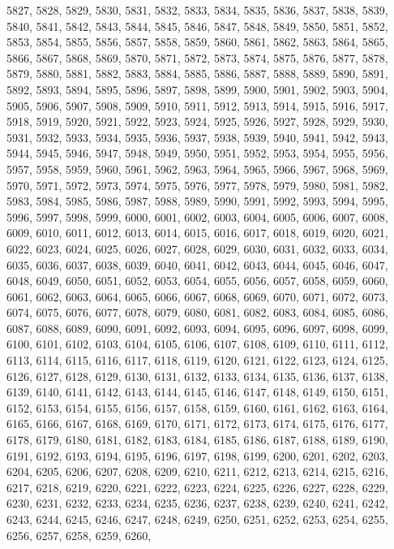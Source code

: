 5827,
5828,
5829,
5830,
5831,
5832,
5833,
5834,
5835,
5836,
5837,
5838,
5839,
5840,
5841,
5842,
5843,
5844,
5845,
5846,
5847,
5848,
5849,
5850,
5851,
5852,
5853,
5854,
5855,
5856,
5857,
5858,
5859,
5860,
5861,
5862,
5863,
5864,
5865,
5866,
5867,
5868,
5869,
5870,
5871,
5872,
5873,
5874,
5875,
5876,
5877,
5878,
5879,
5880,
5881,
5882,
5883,
5884,
5885,
5886,
5887,
5888,
5889,
5890,
5891,
5892,
5893,
5894,
5895,
5896,
5897,
5898,
5899,
5900,
5901,
5902,
5903,
5904,
5905,
5906,
5907,
5908,
5909,
5910,
5911,
5912,
5913,
5914,
5915,
5916,
5917,
5918,
5919,
5920,
5921,
5922,
5923,
5924,
5925,
5926,
5927,
5928,
5929,
5930,
5931,
5932,
5933,
5934,
5935,
5936,
5937,
5938,
5939,
5940,
5941,
5942,
5943,
5944,
5945,
5946,
5947,
5948,
5949,
5950,
5951,
5952,
5953,
5954,
5955,
5956,
5957,
5958,
5959,
5960,
5961,
5962,
5963,
5964,
5965,
5966,
5967,
5968,
5969,
5970,
5971,
5972,
5973,
5974,
5975,
5976,
5977,
5978,
5979,
5980,
5981,
5982,
5983,
5984,
5985,
5986,
5987,
5988,
5989,
5990,
5991,
5992,
5993,
5994,
5995,
5996,
5997,
5998,
5999,
6000,
6001,
6002,
6003,
6004,
6005,
6006,
6007,
6008,
6009,
6010,
6011,
6012,
6013,
6014,
6015,
6016,
6017,
6018,
6019,
6020,
6021,
6022,
6023,
6024,
6025,
6026,
6027,
6028,
6029,
6030,
6031,
6032,
6033,
6034,
6035,
6036,
6037,
6038,
6039,
6040,
6041,
6042,
6043,
6044,
6045,
6046,
6047,
6048,
6049,
6050,
6051,
6052,
6053,
6054,
6055,
6056,
6057,
6058,
6059,
6060,
6061,
6062,
6063,
6064,
6065,
6066,
6067,
6068,
6069,
6070,
6071,
6072,
6073,
6074,
6075,
6076,
6077,
6078,
6079,
6080,
6081,
6082,
6083,
6084,
6085,
6086,
6087,
6088,
6089,
6090,
6091,
6092,
6093,
6094,
6095,
6096,
6097,
6098,
6099,
6100,
6101,
6102,
6103,
6104,
6105,
6106,
6107,
6108,
6109,
6110,
6111,
6112,
6113,
6114,
6115,
6116,
6117,
6118,
6119,
6120,
6121,
6122,
6123,
6124,
6125,
6126,
6127,
6128,
6129,
6130,
6131,
6132,
6133,
6134,
6135,
6136,
6137,
6138,
6139,
6140,
6141,
6142,
6143,
6144,
6145,
6146,
6147,
6148,
6149,
6150,
6151,
6152,
6153,
6154,
6155,
6156,
6157,
6158,
6159,
6160,
6161,
6162,
6163,
6164,
6165,
6166,
6167,
6168,
6169,
6170,
6171,
6172,
6173,
6174,
6175,
6176,
6177,
6178,
6179,
6180,
6181,
6182,
6183,
6184,
6185,
6186,
6187,
6188,
6189,
6190,
6191,
6192,
6193,
6194,
6195,
6196,
6197,
6198,
6199,
6200,
6201,
6202,
6203,
6204,
6205,
6206,
6207,
6208,
6209,
6210,
6211,
6212,
6213,
6214,
6215,
6216,
6217,
6218,
6219,
6220,
6221,
6222,
6223,
6224,
6225,
6226,
6227,
6228,
6229,
6230,
6231,
6232,
6233,
6234,
6235,
6236,
6237,
6238,
6239,
6240,
6241,
6242,
6243,
6244,
6245,
6246,
6247,
6248,
6249,
6250,
6251,
6252,
6253,
6254,
6255,
6256,
6257,
6258,
6259,
6260,
